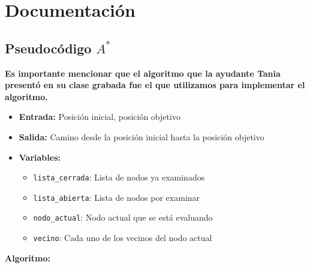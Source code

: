 \section{Documentación}

\subsection*{Pseudocódigo $A^{*}$}

\textbf{Es importante mencionar que el algoritmo que la ayudante Tania presentó en su clase grabada fue el que utilizamos 
para implementar el algoritmo.}\\ 

\begin{itemize}
    \item[] \textbf{Entrada:} Posición inicial, posición objetivo
    \item[] \textbf{Salida:} Camino desde la posición inicial hasta la posición objetivo
    \item[] \textbf{Variables:}
    \begin{itemize}
        \item[] \texttt{lista\_cerrada}: Lista de nodos ya examinados
        \item[] \texttt{lista\_abierta}: Lista de nodos por examinar
        \item[] \texttt{nodo\_actual}: Nodo actual que se está evaluando
        \item[] \texttt{vecino}: Cada uno de los vecinos del nodo actual
    \end{itemize}
\end{itemize}

\textbf{Algoritmo:}

